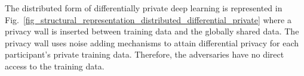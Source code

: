 The distributed form of differentially private deep learning is represented in Fig.~\ref{fig_structural_representation_distributed_differential_private} where a privacy wall is inserted between training data and the globally shared data. The privacy wall uses noise adding mechanisms to attain differential privacy for each participant's private training data. Therefore, the adversaries have no direct access to the training data. 
     



